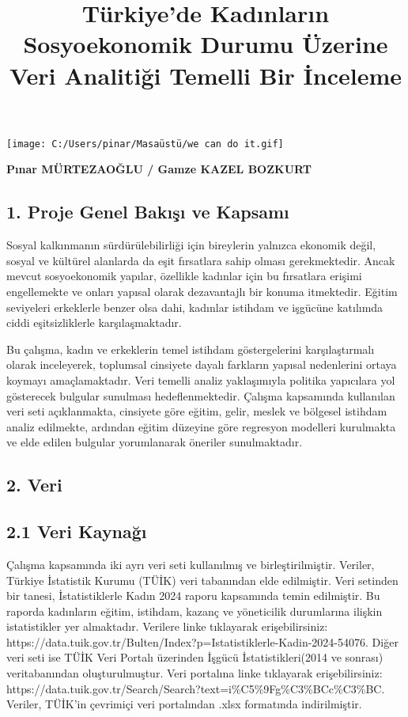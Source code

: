 \documentclass[
  11pt,
  a4paper,
  DIV=11,
  numbers=noendperiod]{scrartcl}
\title{Türkiye'de Kadınların Sosyoekonomik Durumu Üzerine Veri Analitiği
Temelli Bir İnceleme}
\author{}
\date{}
\begin{document}
\maketitle


\texttt{[image: C:/Users/pinar/Masaüstü/we can do it.gif]}

\textbf{Pınar MÜRTEZAOĞLU / Gamze KAZEL BOZKURT}

\subsection{1. Proje Genel Bakışı ve
Kapsamı}\label{proje-genel-bakux131ux15fux131-ve-kapsamux131}

Sosyal kalkınmanın sürdürülebilirliği için bireylerin yalnızca ekonomik
değil, sosyal ve kültürel alanlarda da eşit fırsatlara sahip olması
gerekmektedir. Ancak mevcut sosyoekonomik yapılar, özellikle kadınlar
için bu fırsatlara erişimi engellemekte ve onları yapısal olarak
dezavantajlı bir konuma itmektedir. Eğitim seviyeleri erkeklerle benzer
olsa dahi, kadınlar istihdam ve işgücüne katılımda ciddi eşitsizliklerle
karşılaşmaktadır.

Bu çalışma, kadın ve erkeklerin temel istihdam göstergelerini
karşılaştırmalı olarak inceleyerek, toplumsal cinsiyete dayalı farkların
yapısal nedenlerini ortaya koymayı amaçlamaktadır. Veri temelli analiz
yaklaşımıyla politika yapıcılara yol gösterecek bulgular sunulması
hedeflenmektedir. Çalışma kapsamında kullanılan veri seti açıklanmakta,
cinsiyete göre eğitim, gelir, meslek ve bölgesel istihdam analiz
edilmekte, ardından eğitim düzeyine göre regresyon modelleri kurulmakta
ve elde edilen bulgular yorumlanarak öneriler sunulmaktadır.

\subsection{2. Veri}\label{veri}

\subsection{2.1 Veri Kaynağı}\label{veri-kaynaux11fux131}

Çalışma kapsamında iki ayrı veri seti kullanılmış ve birleştirilmiştir.
Veriler, Türkiye İstatistik Kurumu (TÜİK) veri tabanından elde
edilmiştir. Veri setinden bir tanesi, İstatistiklerle Kadın 2024 raporu
kapsamında temin edilmiştir. Bu raporda kadınların eğitim, istihdam,
kazanç ve yöneticilik durumlarına ilişkin istatistikler yer almaktadır.
Verilere linke tıklayarak erişebilirsiniz:
https://data.tuik.gov.tr/Bulten/Index?p=Istatistiklerle-Kadin-2024-54076.
Diğer veri seti ise TÜİK Veri Portalı üzerinden İşgücü
İstatistikleri(2014 ve sonrası) veritabanından oluşturulmuştur. Veri
portalına linke tıklayarak erişebilirsiniz:
https://data.tuik.gov.tr/Search/Search?text=i\%C5\%9Fg\%C3\%BCc\%C3\%BC.
Veriler, TÜİK'in çevrimiçi veri portalından .xlsx formatında
indirilmiştir.
\end{document}
